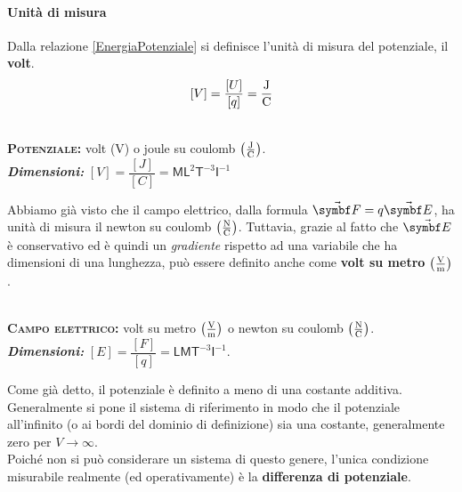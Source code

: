 \paragraph{Unità di misura}
Dalla relazione \eqref{EnergiaPotenziale} si definisce l'unità di misura del potenziale, il \textbf{volt}.
\begin{equation*}
	\left[V\right]=\frac{[U]}{[q]}=\unit[per-mode = fraction]{\joule\per\coulomb}
\end{equation*}
\begin{units}~\\
	\textbf{\textsc{Potenziale:}} volt ($\unit{\volt}$) o joule su coulomb $\left(\unit[per-mode = fraction]{\joule\per\coulomb}\right)$.\\
	\textit{\textbf{Dimensioni:}} $[V]=\dfrac{[J]}{[C]}=\mathsf{M} \mathsf{L}^2  \mathsf{T}^{-3}\mathsf{I}^{-1}$
\end{units}
\noindent Abbiamo già visto che il campo elettrico, dalla formula $\vba{F}=q\vba{E}$, ha unità di misura il newton su coulomb $\left(\unit[per-mode = fraction]{\newton\per\coulomb}\right)$. Tuttavia, grazie al fatto che $\vba{E}$ è conservativo ed è quindi un \textit{gradiente} rispetto ad una variabile che ha dimensioni di una lunghezza, può essere definito anche come \textbf{volt su metro} $\left(\unit[per-mode = fraction]{\volt\per\metre}\right)$.
\begin{units}~\\
	\textbf{\textsc{Campo elettrico:}} volt su metro $\left(\unit[per-mode = fraction]{\volt\per\metre}\right)$ o newton su coulomb $\left(\unit[per-mode = fraction]{\newton\per\coulomb}\right)$.\\
	\textit{\textbf{Dimensioni:}} $[E]=\dfrac{[F]}{[q]}=\mathsf{L}\mathsf{M}\mathsf{T}^{-3}\mathsf{I}^{-1}$.
\end{units}
\begin{observe}
	Come già detto, il potenziale è definito a meno di una costante additiva. Generalmente si pone il sistema di riferimento in modo che il potenziale all'infinito (o ai bordi del dominio di definizione) sia una costante, generalmente zero per $V\to\infty$.\\
	Poiché non si può considerare un sistema di questo genere, l'unica condizione misurabile realmente (ed operativamente) è la \textbf{differenza di potenziale}.
\end{observe}
